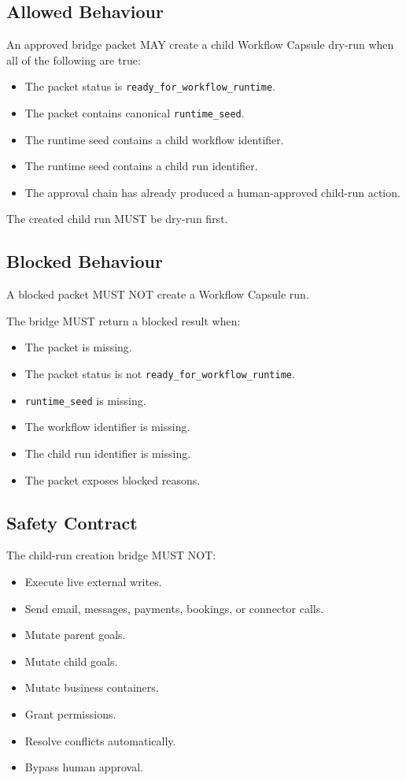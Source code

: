 \subsection{Allowed Behaviour}

An approved bridge packet MAY create a child Workflow Capsule dry-run when all of the following are true:

\begin{itemize}
  \item The packet status is \texttt{ready\_for\_workflow\_runtime}.
  \item The packet contains canonical \texttt{runtime\_seed}.
  \item The runtime seed contains a child workflow identifier.
  \item The runtime seed contains a child run identifier.
  \item The approval chain has already produced a human-approved child-run action.
\end{itemize}

The created child run MUST be dry-run first.

\subsection{Blocked Behaviour}

A blocked packet MUST NOT create a Workflow Capsule run.

The bridge MUST return a blocked result when:

\begin{itemize}
  \item The packet is missing.
  \item The packet status is not \texttt{ready\_for\_workflow\_runtime}.
  \item \texttt{runtime\_seed} is missing.
  \item The workflow identifier is missing.
  \item The child run identifier is missing.
  \item The packet exposes blocked reasons.
\end{itemize}

\subsection{Safety Contract}

The child-run creation bridge MUST NOT:

\begin{itemize}
  \item Execute live external writes.
  \item Send email, messages, payments, bookings, or connector calls.
  \item Mutate parent goals.
  \item Mutate child goals.
  \item Mutate business containers.
  \item Grant permissions.
  \item Resolve conflicts automatically.
  \item Bypass human approval.
\end{itemize}

